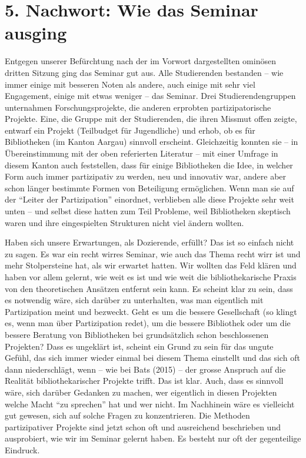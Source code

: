 \documentclass[a4paper,
fontsize=11pt,
oneside,
numbers=noperiodatend,
parskip=half-,
bibliography=totoc,
final
]{scrartcl}
\begin{document}
\section{5. Nachwort: Wie das Seminar
ausging}\label{nachwort-wie-das-seminar-ausging}

Entgegen unserer Befürchtung nach der im Vorwort dargestellten ominösen
dritten Sitzung ging das Seminar gut aus. Alle Studierenden bestanden --
wie immer einige mit besseren Noten als andere, auch einige mit sehr
viel Engagement, einige mit etwas weniger -- das Seminar. Drei
Studierendengruppen unternahmen Forschungsprojekte, die anderen
erprobten partizipatorische Projekte. Eine, die Gruppe mit der
Studierenden, die ihren Missmut offen zeigte, entwarf ein Projekt
(Teilbudget für Jugendliche) und erhob, ob es für Bibliotheken (im
Kanton Aargau) sinnvoll erscheint. Gleichzeitig konnten sie -- in
Übereinstimmung mit der oben referierten Literatur -- mit einer Umfrage
in diesem Kanton auch feststellen, dass für einige Bibliotheken die
Idee, in welcher Form auch immer partizipativ zu werden, neu und
innovativ war, andere aber schon länger bestimmte Formen von Beteiligung
ermöglichen. Wenn man sie auf der \enquote{Leiter der Partizipation}
einordnet, verblieben alle diese Projekte sehr weit unten -- und selbst
diese hatten zum Teil Probleme, weil Bibliotheken skeptisch waren und
ihre eingespielten Strukturen nicht viel ändern wollten.

Haben sich unsere Erwartungen, als Dozierende, erfüllt? Das ist so
einfach nicht zu sagen. Es war ein recht wirres Seminar, wie auch das
Thema recht wirr ist und mehr Stolpersteine hat, als wir erwartet
hatten. Wir wollten das Feld klären und haben vor allem gelernt, wie
weit es ist und wie weit die bibliothekarische Praxis von den
theoretischen Ansätzen entfernt sein kann. Es scheint klar zu sein, dass
es notwendig wäre, sich darüber zu unterhalten, was man eigentlich mit
Partizipation meint und bezweckt. Geht es um die bessere Gesellschaft
(so klingt es, wenn man über Partizipation redet), um die bessere
Bibliothek oder um die bessere Beratung von Bibliotheken bei
grundsätzlich schon beschlossenen Projekten? Dass es ungeklärt ist,
scheint ein Grund zu sein für das ungute Gefühl, das sich immer wieder
einmal bei diesem Thema einstellt und das sich oft dann niederschlägt,
wenn -- wie bei Bats (2015) -- der grosse Anspruch auf die Realität
bibliothekarischer Projekte trifft. Das ist klar. Auch, dass es sinnvoll
wäre, sich darüber Gedanken zu machen, wer eigentlich in diesen
Projekten welche Macht \enquote{zu sprechen} hat und wer nicht. Im
Nachhinein wäre es vielleicht gut gewesen, sich auf solche Fragen zu
konzentrieren. Die Methoden partizipativer Projekte sind jetzt schon oft
und ausreichend beschrieben und ausprobiert, wie wir im Seminar gelernt
haben. Es besteht nur oft der gegenteilige Eindruck.
\end{document}

